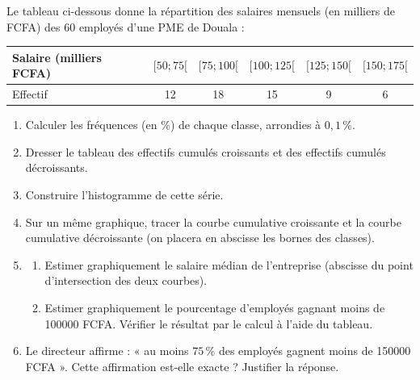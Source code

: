 \documentclass[11pt]{article}
\begin{document}
\begin{exercice}
Le tableau ci-dessous donne la répartition des salaires mensuels (en milliers de FCFA) des $60$ employés d'une PME de Douala :
\begin{center}
\begin{tabular}{|l|c|c|c|c|c|}
\hline
Salaire (milliers FCFA) & $[50 ; 75[$ & $[75 ; 100[$ & $[100 ; 125[$ & $[125 ; 150[$ & $[150 ; 175[$ \\
\hline
Effectif & 12 & 18 & 15 & 9 & 6 \\
\hline
\end{tabular}
\end{center}
\begin{enumerate}
\item Calculer les fréquences (en $\%$) de chaque classe, arrondies à $0,1\,\%$.
\item Dresser le tableau des effectifs cumulés croissants et des effectifs cumulés décroissants.
\item Construire l'histogramme de cette série.
\item Sur un même graphique, tracer la courbe cumulative croissante et la courbe cumulative décroissante (on placera en abscisse les bornes des classes).
\item \begin{enumerate}
\item Estimer graphiquement le salaire médian de l'entreprise (abscisse du point d'intersection des deux courbes).
\item Estimer graphiquement le pourcentage d'employés gagnant moins de \num{100000} FCFA. Vérifier le résultat par le calcul à l'aide du tableau.
\end{enumerate}
\item Le directeur affirme : « au moins $75\,\%$ des employés gagnent moins de \num{150000} FCFA ». Cette affirmation est-elle exacte ? Justifier la réponse.
\end{enumerate}
\end{exercice}
\end{document}
